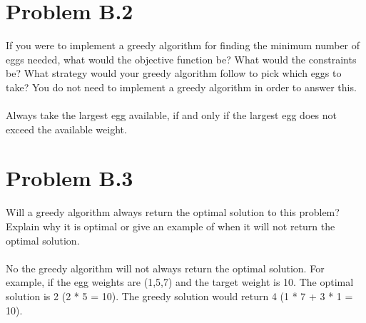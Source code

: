 \documentclass[letterpaper,11pt]{article}
\begin{document}
\section*{Problem B.2}
If you were to implement a greedy algorithm for finding the minimum number of eggs needed, what would the objective function be?
What would the constraints be? What strategy would your greedy algorithm follow to pick which eggs to take? 
You do not need to implement a greedy algorithm in order to answer this.\\
\\
Always take the largest egg available, if and only if the largest egg does not exceed the available weight. 

\section*{Problem B.3}
Will a greedy algorithm always return the optimal solution to this problem?
Explain why it is optimal or give an example of when it will not return the optimal solution.\\
\\
No the greedy algorithm will not always return the optimal solution. 
For example, if the egg weights are (1,5,7) and the target weight is 10. The optimal solution is 2 (2 * 5 = 10).
The greedy solution would return 4 (1 * 7 + 3 * 1 = 10).
\end{document}
